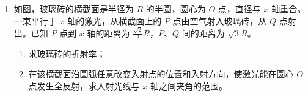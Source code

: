 \documentclass[\gkver]{gaokaozhenti}
\begin{document}
\begin{enumerate}
{（2）用该欧姆表对阻值为 $150 \UO$ 的标准电阻进行试测，为减小测量误差，应选用欧姆表的 $\times 10$ 挡；

进行欧姆调零后，将电阻接在两表笔间，指针指向图乙中的虚线位置，则该电阻的测量值为 $16 \times 10 \UO = 160 \UO$

（3）根据闭合电路欧姆定律 $E = I_{1}(r + R_{g} + R_{\text{阻}})$，$E = I_{2}(r + R_{g} + R_{\text{阻}}')$

代入数据 $I_{1} = 10 \UmA$，$I_{2} = 20 \UmA$

联立可得 $r = 7 \UO$，$E = 2.8 \UV$
}

\item
如图，玻璃砖的横截面是半径为 $R$ 的半圆，圆心为 $O$ 点，直径与 $x$ 轴重合。一束平行于 $x$ 轴的激光，从横截面上的 $P$ 点由空气射入玻璃砖，从 $Q$ 点射出。已知 $P$ 点到 $x$ 轴的距离为 $\frac{\sqrt{2}}{2}R$，$P$、$Q$ 间的距离为 $\sqrt{3}R$。
\begin{enumerate}
\item
求玻璃砖的折射率；
\item
在该横截面沿圆弧任意改变入射点的位置和入射方向，使激光能在圆心 $O$ 点发生全反射，求入射光线与 $x$ 轴之间夹角的范围。
\end{enumerate}

\onepicture[w=5.50cm, align=right]{}

\jdanswer{
\begin{enumerate}
\item
$\sqrt{2}$

\item
$(0, 45^{\circ}]$ 或 $[135^{\circ}, 180^{\circ})$
\end{enumerate}
}
\end{enumerate}
\end{document}
